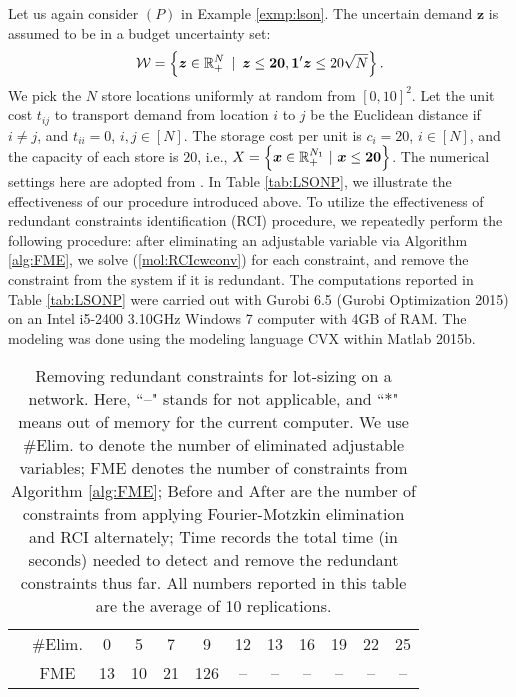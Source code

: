 \documentclass[fleqn,orsc,blindrev]{informs4}
\newcommand{\mb}[1]{\mbox{\boldmath \ensuremath{#1}}}
\begin{document}
		\begin{example} \label{exp:rrc}
			Let us again consider $(P)$ in Example \ref{exmp:lson}. The uncertain demand $\boldsymbol{z}$ is assumed to be in a budget uncertainty set: 
\begin{equation}\label{set:bus}
				\mathcal{W}=\left\{ \boldsymbol{z} \in \mathbb{R}^{N}_+ \enskip| \enskip \boldsymbol{z} \le \boldsymbol{20}, \boldsymbol{1}'\boldsymbol{z} \le 20\sqrt{N} \right\}.
\end{equation}
			We pick the $N$ store locations uniformly at random from $[0,10]^2$. Let the unit cost $t_{ij}$ to transport demand from location $i$ to $j$ be the Euclidean distance if $i\ne j$, and $t_{ii}=0$, $i,j\in [N]$. The storage cost per unit is $c_i=20$, $i\in [N]$, and the capacity of each store is $20$, i.e., $X=\left\{ \mb{x} \in \mathbb{R}^{N_1}_+ \,\, |\,\,  \mb{x} \le \mb{20} \right\}$. The numerical settings here are adopted from \cite{bd16}. In Table \ref{tab:LSONP}, we illustrate the effectiveness of our procedure introduced above. To utilize the effectiveness of redundant constraints identification (RCI) procedure, we repeatedly perform the following procedure: after eliminating an adjustable variable via Algorithm \ref{alg:FME}, we solve (\ref{mol:RCIcwconv}) for each constraint, and remove the constraint from the system if it is redundant. The computations reported in Table \ref{tab:LSONP} were carried out with Gurobi 6.5 (Gurobi Optimization 2015) on an Intel i5-2400 3.10GHz Windows 7 computer with 4GB of RAM. The modeling was done using the modeling language CVX within Matlab 2015b.
\begin{table*}[t]
\centering
\caption{Removing redundant constraints for lot-sizing on a network. Here, ``--" stands for not applicable, and ``$*$" means out of memory for the current computer. We use \#Elim. to denote the number of eliminated adjustable variables; FME denotes the number of constraints from Algorithm \ref{alg:FME}; Before and After are the number of constraints from applying Fourier-Motzkin elimination and RCI alternately; Time records the total time (in seconds) needed to detect and remove the redundant constraints thus far. All numbers reported in this table are the average of 10 replications.}
\def\arraystretch{1.3}\begin{tabular}{rc|cccccccccc}
\cline{2-12}
& \#Elim. & 0     & 5     & 7     & 9     & 12    &  13     & 16    & 19    & 22    & 25 \\ \cline{2-12}
& FME   & 13    & 10    & 21  & 126 & --     & --      &  --      &  --      &  --      &  --  \\  

\end{tabular}
\end{table*}
\end{example}
\end{document}

